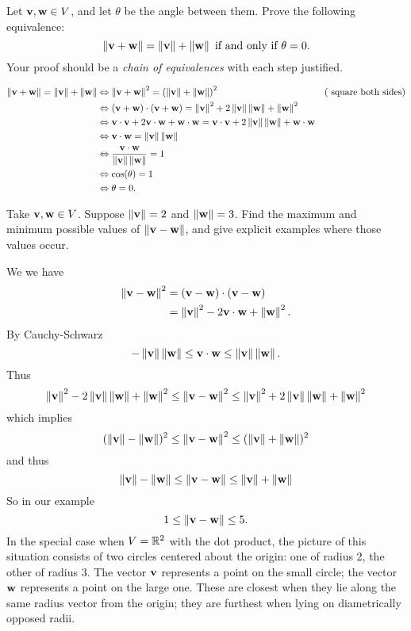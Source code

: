 \ii Let $\boldv, \boldw\in V$, and let $\theta$ be the angle between them. Prove the following equivalence:
\[
\norm{\boldv+\boldw}=\norm{\boldv}+\norm{\boldw}\text{ if and only if } \theta=0.
\]
Your proof should be a {\em chain of equivalences} with each step justified. 
\\
\begin{solution}
\begin{align*}
\norm{\boldv+\boldw}=\norm{\boldv}+\norm{\boldw}&\Leftrightarrow
\norm{\boldv+\boldw}^2=\left(\norm{\boldv}+\norm{\boldw}\right)^2
&\text{( square both sides)}\\
&\Leftrightarrow (\boldv+\boldw)\cdot(\boldv+\boldw)=\norm{\boldv}^2+2\norm{\boldv}\norm{\boldw}+\norm{\boldw}^2\\
&\Leftrightarrow \boldv\cdot\boldv+2\boldv\cdot\boldw+\boldw\cdot\boldw=\boldv\cdot\boldv+2\norm{\boldv}\norm{\boldw}+\boldw\cdot\boldw\\
&\Leftrightarrow \boldv\cdot\boldw=\norm{\boldv}\norm{\boldw}\\
&\Leftrightarrow \frac{\boldv\cdot\boldw}{\norm{\boldv}\norm{\boldw}}=1\\
&\Leftrightarrow \cos(\theta)=1\\
&\Leftrightarrow \theta=0.
\end{align*}
\end{solution}
\ii Take $\boldv,\boldw\in V$. Suppose $\norm{\boldv}=2$ and $\norm{\boldw}=3$. Find the maximum and minimum possible values of $\norm{\boldv-\boldw}$, and give explicit examples where those values occur. 
\\
\begin{solution}
We  we have 
\begin{align*}
\norm{\boldv-\boldw}^2&=(\boldv-\boldw)\cdot(\boldv-\boldw)\\
&=\norm{\boldv}^2-2\boldv\cdot\boldw+\norm{\boldw}^2.
\end{align*}
By Cauchy-Schwarz 
\[
- \norm{\boldv}\norm{\boldw}\leq\boldv\cdot\boldw\leq \norm{\boldv}\norm{\boldw}.
\]
Thus 
\[
\norm{\boldv}^2-2\norm{\boldv}\norm{\boldw}+\norm{\boldw}^2\leq\norm{\boldv-\boldw}^2\leq 
\norm{\boldv}^2+2\norm{\boldv}\norm{\boldw}+\norm{\boldw}^2
\]
which implies 
\[
(\norm{\boldv}-\norm{\boldw})^2\leq\norm{\boldv-\boldw}^2\leq(\norm{\boldv}+\norm{\boldw})^2
\]
and thus
\[
\norm{\boldv}-\norm{\boldw}\leq\norm{\boldv-\boldw}\leq\norm{\boldv}+\norm{\boldw}
\]
So in our example 
\[
1\leq \norm{\boldv-\boldw}\leq 5.
\]
In the special case when $V=\R^2$ with the dot product, the picture of this situation consists of two circles centered about the origin: one of radius 2, the other of radius 3. The vector $\boldv$ represents a point on the small circle; the vector $\boldw$ represents a point on the large one. These are closest when they lie along the same radius vector from the origin; they are furthest when lying on diametrically opposed radii.  
\end{solution}
